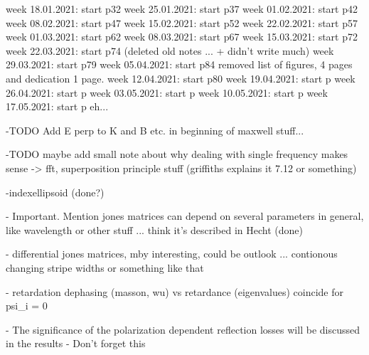 week 18.01.2021: start p32
week 25.01.2021: start p37
week 01.02.2021: start p42
week 08.02.2021: start p47
week 15.02.2021: start p52
week 22.02.2021: start p57
week 01.03.2021: start p62
week 08.03.2021: start p67
week 15.03.2021: start p72
week 22.03.2021: start p74 (deleted old notes ... + didn't write much)
week 29.03.2021: start p79
week 05.04.2021: start p84 removed list of figures, 4 pages and dedication 1 page.
week 12.04.2021: start p80
week 19.04.2021: start p
week 26.04.2021: start p
week 03.05.2021: start p
week 10.05.2021: start p
week 17.05.2021: start p eh...


-TODO Add E perp to K and B etc. in beginning of maxwell stuff...

-TODO maybe add small note about why dealing with single frequency makes sense -> fft, superposition principle stuff (griffiths explains it 7.12 or something)

-indexellipsoid (done?)

- Important. Mention jones matrices can depend on several parameters in general, like wavelength or other stuff ... think it's described in Hecht (done)

- differential jones matrices, mby interesting, could be outlook ... contionous changing stripe widths or something like that

- retardation dephasing (masson, wu) vs retardance (eigenvalues) coincide for psi_i = 0

- The significance of the polarization dependent reflection losses will be discussed in the results
    - Don't forget this
    

